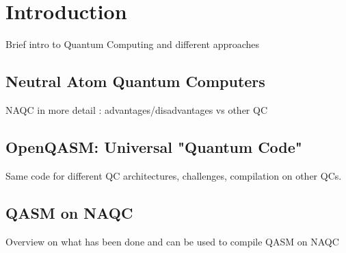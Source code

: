 \section{Introduction}
\label{sec:intro}


Brief intro to Quantum Computing and different approaches 

\subsection{Neutral Atom Quantum Computers}
\label{sec:NAQC}
NAQC in more detail : advantages/disadvantages vs other QC

\subsection{OpenQASM: Universal "Quantum Code"}
\label{sec:QASM_universal}

Same code for different QC architectures, challenges, compilation on other QCs.

\subsection{QASM on NAQC}
\label{sec:QASM_NAQC}
Overview on what has been done and can be used to compile QASM on NAQC